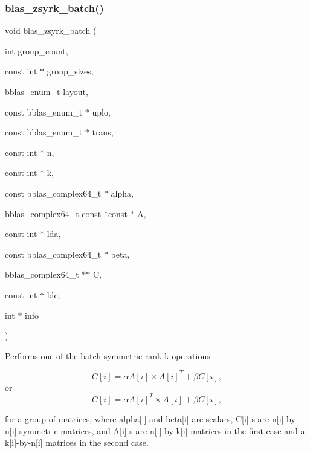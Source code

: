 \subsubsection{\texorpdfstring{blas\+\_\+zsyrk\+\_\+batch()}{blas\_zsyrk\_batch()}}
{\footnotesize\ttfamily void blas\+\_\+zsyrk\+\_\+batch (\begin{DoxyParamCaption}\item[{int}]{group\+\_\+count,  }\item[{const int $\ast$}]{group\+\_\+sizes,  }\item[{bblas\+\_\+enum\+\_\+t}]{layout,  }\item[{const bblas\+\_\+enum\+\_\+t $\ast$}]{uplo,  }\item[{const bblas\+\_\+enum\+\_\+t $\ast$}]{trans,  }\item[{const int $\ast$}]{n,  }\item[{const int $\ast$}]{k,  }\item[{const bblas\+\_\+complex64\+\_\+t $\ast$}]{alpha,  }\item[{bblas\+\_\+complex64\+\_\+t const $\ast$const $\ast$}]{A,  }\item[{const int $\ast$}]{lda,  }\item[{const bblas\+\_\+complex64\+\_\+t $\ast$}]{beta,  }\item[{bblas\+\_\+complex64\+\_\+t $\ast$$\ast$}]{C,  }\item[{const int $\ast$}]{ldc,  }\item[{int $\ast$}]{info }\end{DoxyParamCaption})}

Performs one of the batch symmetric rank k operations

\[ C[i] = \alpha A[i] \times A[i]^T + \beta C[i], \] or \[ C[i] = \alpha A[i]^T \times A[i] + \beta C[i], \]

for a group of matrices, where alpha\mbox{[}i\mbox{]} and beta\mbox{[}i\mbox{]} are scalars, C\mbox{[}i\mbox{]}-\/s are n\mbox{[}i\mbox{]}-\/by-\/n\mbox{[}i\mbox{]} symmetric matrices, and A\mbox{[}i\mbox{]}-\/s are n\mbox{[}i\mbox{]}-\/by-\/k\mbox{[}i\mbox{]} matrices in the first case and a k\mbox{[}i\mbox{]}-\/by-\/n\mbox{[}i\mbox{]} matrices in the second case.



